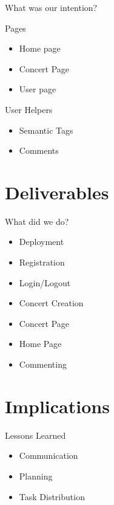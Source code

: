 \documentclass{beamer}
\begin{document}
\begin{frame}{What was our intention?}
  \begin{block}{Pages}
    \begin{itemize}
    \item Home page
    \item Concert Page
  	\item User page
    \end{itemize}
  \end{block}
  
  \begin{block}{User Helpers}
    \begin{itemize}
  	\item Semantic Tags
  	\item Comments
    \end{itemize}
  \end{block}
\end{frame}

\section{Deliverables}

\begin{frame}{What did we do?}

  \begin{itemize}
  \item Deployment
  \item Registration
  \item Login/Logout
  \item Concert Creation
  \item Concert Page
  \item Home Page
  \item Commenting
    
  \end{itemize}
\end{frame}

\section{Implications}
\begin{frame}
  {Lessons Learned}

  \begin{itemize}
  \item Communication
  \item Planning
  \item Task Distribution
    
  \end{itemize}
\end{frame}
\end{document}
